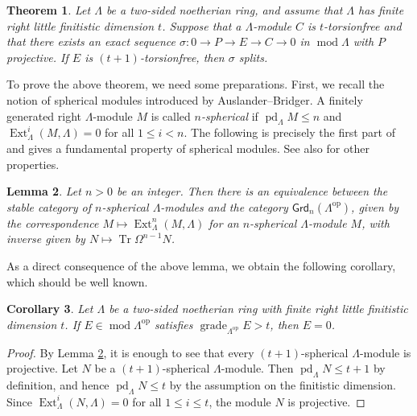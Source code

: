 \documentclass{amsart}
\newtheorem{thm}{Theorem}[section]
\newtheorem{lem}[thm]{Lemma}
\newtheorem{cor}[thm]{Corollary}
\theoremstyle{definition}
\theoremstyle{remark}
\numberwithin{equation}{thm}
\def\Ext{\operatorname{Ext}}
\def\grade{\operatorname{grade}}
\def\grd{\mathsf{Grd}}
\def\le{\leqslant}
\def\mod{\operatorname{mod}}
\def\pd{\operatorname{pd}}
\def\syz{\Omega}
\def\Trf{\mathsf{Trf}}
\def\tr{\operatorname{Tr}}
\begin{document}
\begin{thm}\label{ARsplit}
Let $\Lambda$ be a two-sided noetherian ring, and assume that $\Lambda$ has finite right little finitistic dimension $t$. Suppose that a $\Lambda$-module $C$ is $t$-torsionfree and that there exists an exact sequence $\sigma:0\to P\to E\to C\to0$ in $\mod\Lambda$ with $P$ projective. If $E$ is $(t+1)$-torsionfree, then $\sigma$ splits.%
\end{thm}

To prove the above theorem, we need some preparations. First, we recall the notion of spherical modules introduced by Auslander--Bridger. A finitely generated right $\Lambda$-module $M$ is called {\em $n$-spherical} if $\pd_\Lambda M\le n$ and $\Ext^i_\Lambda(M,\Lambda)=0$ for all $1\le i<n$. The following is precisely the first part of \cite[Theorem 1.1]{Ost} and gives a fundamental property of spherical modules. See also \cite{AB,BHHPT} for other properties.

\begin{lem}\label{spher}
Let $n>0$ be an integer. Then there is an equivalence between the stable category of $n$-spherical $\Lambda$-modules and the category $\grd_n(\Lambda^{\mathrm{op}})$, given by the correspondence $M\mapsto\Ext^n_\Lambda(M,\Lambda)$ for an $n$-spherical $\Lambda$-module $M$, with inverse given by $N\mapsto\tr\syz^{n-1}N$.
\end{lem}

As a direct consequence of the above lemma, we obtain the following corollary, which should be well known.

\begin{cor}\label{findim}
Let $\Lambda$ be a two-sided noetherian ring with finite right little finitistic dimension $t$.
If $E\in\mod\Lambda^{\mathrm{op}}$ satisfies $\grade_{\Lambda^{\mathrm{op}}}E>t$, then $E=0$.
\end{cor}

\begin{proof}
By Lemma \ref{spher}, it is enough to see that every $(t+1)$-spherical $\Lambda$-module is projective.
Let $N$ be a $(t+1)$-spherical $\Lambda$-module. Then $\pd_\Lambda N\le t+1$ by definition, and hence $\pd_\Lambda N\le t$ by the assumption on the finitistic dimension. Since $\Ext^i_\Lambda(N,\Lambda)=0$ for all $1\le i\le t$, the module $N$ is projective.
\end{proof}
\end{document}
